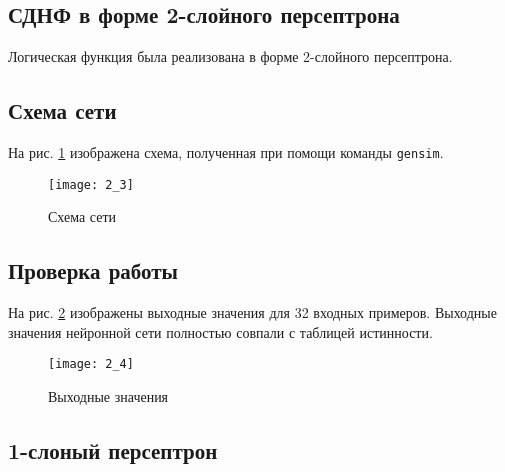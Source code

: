 
\subsection{СДНФ в форме 2-слойного персептрона}


Логическая функция была реализована в форме 2-слойного персептрона. 

\subsection{Схема сети}



На рис. \ref{fig:2_3} изображена схема, полученная при помощи команды \verb+gensim+.

\begin{figure}[H]
\begin{center}
	\texttt{[image: 2\_3]}
	\caption{Схема сети}
	\label{fig:2_3}
\end{center}
\end{figure}

\subsection{Проверка работы}


На рис. \ref{fig:2_4} изображены выходные значения для 32 входных примеров. Выходные значения нейронной сети полностью совпали с таблицей истинности.

\begin{figure}[H]
\begin{center}
	\texttt{[image: 2\_4]}
	\caption{Выходные значения}
	\label{fig:2_4}
\end{center}
\end{figure}

\subsection{1-слоный персептрон}


